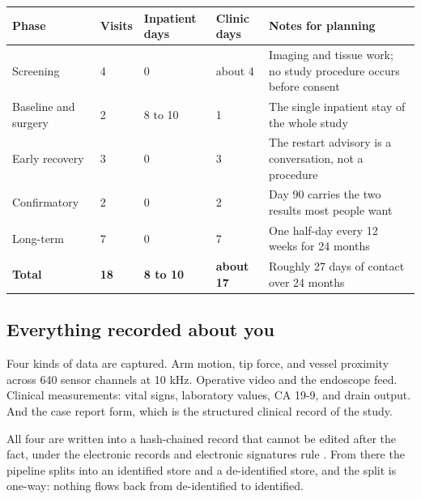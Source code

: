 \vspace{-0.7cm}

\vspace{0.30em}

\noindent\begin{tabularx}{\textwidth}{L{3.3cm} C{1.4cm} C{2.0cm} C{1.9cm} Y}
\toprule
\textbf{Phase} & \textbf{Visits} & \textbf{Inpatient days} & \textbf{Clinic days} & \textbf{Notes for planning} \\
\midrule
Screening & 4 & 0 & about 4 & Imaging and tissue work; no study procedure occurs before consent \\
Baseline and surgery & 2 & 8 to 10 & 1 & The single inpatient stay of the whole study \\
Early recovery & 3 & 0 & 3 & The restart advisory is a conversation, not a procedure \\
Confirmatory & 2 & 0 & 2 & Day 90 carries the two results most people want \\
Long-term & 7 & 0 & 7 & One half-day every 12 weeks for 24 months \\
\textbf{Total} & \textbf{18} & \textbf{8 to 10} & \textbf{about 17} & Roughly 27 days of contact over 24 months \\
\bottomrule
\end{tabularx}

\vspace{0.30em}

\subsection{Everything recorded about you}

Four kinds of data are captured. Arm motion, tip force, and vessel proximity
across 640 sensor channels at 10 kHz. Operative video and the endoscope feed.
Clinical measurements: vital signs, laboratory values, CA 19-9, and drain
output. And the case report form, which is the structured clinical record of the
study.

All four are written into a hash-chained record that cannot be edited after the
fact, under the electronic records and electronic signatures rule
\cite{ecfr2026part11}. From there the pipeline splits into an identified store
and a de-identified store, and the split is one-way: nothing flows back from
de-identified to identified.

